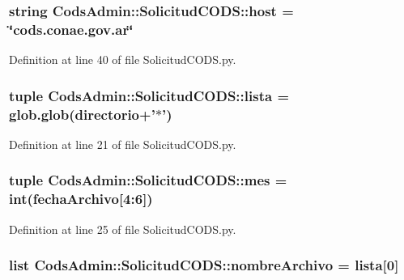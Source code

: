 \subsubsection[{host}]{\setlength{\rightskip}{0pt plus 5cm}string {\bf \-Cods\-Admin\-::\-Solicitud\-C\-O\-D\-S\-::host} = \char`\"{}cods.\-conae.\-gov.\-ar\char`\"{}}\label{namespace_cods_admin_1_1_solicitud_c_o_d_s_afb70349e36910c2a60a88457ec49e6df}


\-Definition at line 40 of file \-Solicitud\-C\-O\-D\-S.\-py.

\subsubsection[{lista}]{\setlength{\rightskip}{0pt plus 5cm}tuple {\bf \-Cods\-Admin\-::\-Solicitud\-C\-O\-D\-S\-::lista} = glob.\-glob({\bf directorio}+'$\ast$')}\label{namespace_cods_admin_1_1_solicitud_c_o_d_s_a795bf4bfba25409025f51f5355875897}


\-Definition at line 21 of file \-Solicitud\-C\-O\-D\-S.\-py.

\subsubsection[{mes}]{\setlength{\rightskip}{0pt plus 5cm}tuple {\bf \-Cods\-Admin\-::\-Solicitud\-C\-O\-D\-S\-::mes} = int({\bf fecha\-Archivo}[4\-:6])}\label{namespace_cods_admin_1_1_solicitud_c_o_d_s_aa76339d091adbdf27bdeeba77ea76219}


\-Definition at line 25 of file \-Solicitud\-C\-O\-D\-S.\-py.

\subsubsection[{nombre\-Archivo}]{\setlength{\rightskip}{0pt plus 5cm}list {\bf \-Cods\-Admin\-::\-Solicitud\-C\-O\-D\-S\-::nombre\-Archivo} = {\bf lista}[0]}\label{namespace_cods_admin_1_1_solicitud_c_o_d_s_a13e1ca61644575b873be14e3efff6d19}


